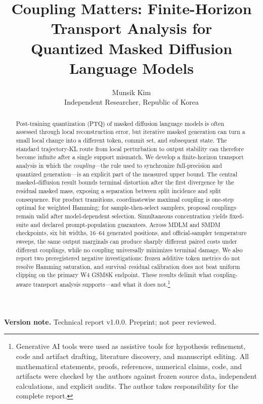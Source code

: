 \documentclass[10pt]{article}
\title{Coupling Matters: Finite-Horizon Transport Analysis for\\Quantized Masked Diffusion Language Models}
\author{\name Munsik Kim \\
\addr Independent Researcher, Republic of Korea}
\theoremstyle{plain}
\theoremstyle{definition}
\theoremstyle{remark}
\begin{document}
\maketitle

\begin{abstract}
Post-training quantization (PTQ) of masked diffusion language models is often assessed through local reconstruction error, but iterative masked generation can turn a small local change into a different token, commit set, and subsequent state. The standard trajectory-KL route from local perturbation to output stability can therefore become infinite after a single support mismatch. We develop a finite-horizon transport analysis in which the \emph{coupling}---the rule used to synchronize full-precision and quantized generation---is an explicit part of the measured upper bound. The central masked-diffusion result bounds terminal distortion after the first divergence by the residual masked mass, exposing a separation between split incidence and split consequence. For product transitions, coordinatewise maximal coupling is one-step optimal for weighted Hamming; for sample-then-select samplers, proposal couplings remain valid after model-dependent selection. Simultaneous concentration yields fixed-suite and declared prompt-population guarantees. Across MDLM and SMDM checkpoints, six bit widths, 16--64 generated positions, and official-sampler temperature sweeps, the same output marginals can produce sharply different paired costs under different couplings, while no coupling universally minimizes terminal damage. We also report two preregistered negative investigations: frozen additive token metrics do not resolve Hamming saturation, and survival--residual calibration does not beat uniform clipping on the primary W4 GSM8K endpoint. These results delimit what coupling-aware transport analysis supports---and what it does not.\footnote{Generative AI tools were used as assistive tools for hypothesis refinement, code and artifact drafting, literature discovery, and manuscript editing. All mathematical statements, proofs, references, numerical claims, code, and artifacts were checked by the authors against frozen source data, independent calculations, and explicit audits. The author takes responsibility for the complete report.}
\end{abstract}

\noindent\textbf{Version note.} Technical report v1.0.0. Preprint; not peer reviewed.







\end{document}
